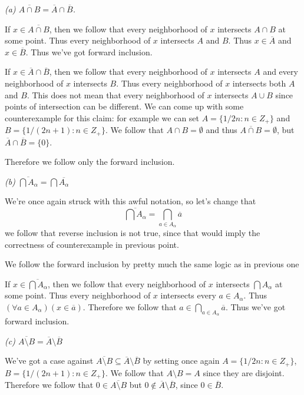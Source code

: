 \documentclass[11pt,oneside,titlepage]{book}
\newcommand{\set}[1]{\{ #1 \}}
\begin{document}
\textit{(a) $\overline{A \cap B} = \overline{A} \cap \overline{B}$.}

If $x \in \overline{A \cap B}$, then we follow that every neighborhood of $x$
intersects $A \cap B$ at some point. Thus every neighborhood of $x$ intersects
$A$ and $B$. Thus $x \in \overline{A}$ and $x \in \overline{B}$. Thus we've got
forward inclusion.

If $x \in \overline{A} \cap \overline{B}$, then we follow that every neighborhood of $x$
intersects $A$ and every neighborhood of $x$ intersects $B$. Thus every
neighborhood of $x$ intersects both $A$ and $B$. This does not mean that
every neighborhood of $x$ intersects $A \cup B$ since points of intersection can be different.
We can come up with some counterexample for this claim:
for example we can set $A = \set{1/2n: n \in Z_+}$ and
$B = \set{1/(2n + 1): n \in Z_+}$. We follow that $A \cap B = \emptyset$ and thus
$\overline{A \cap B} = \emptyset$, but $\overline{A} \cap \overline{B} = \set{0}$.

Therefore we follow only the forward inclusion.

\textit{(b) $\overline{\bigcap{A_\alpha}} = \bigcap{\overline{A_\alpha}}$}

We're once again struck with this awful notation, so let's change that
$$\overline{\bigcap{A_\alpha}} = \bigcap_{a \in A_\alpha}{\overline{a}}$$
we follow that reverse inclusion is not true, since that would imply
the correctness of counterexample in previous point.

We follow the forward inclusion by pretty much the same logic as in previous one

If $x \in \overline{\bigcap{A_\alpha}}$, then we follow that every neighborhood of $x$
intersects $\bigcap{A_\alpha}$ at some point. Thus every neighborhood of $x$ intersects
every $a \in A_\alpha$. Thus $(\forall a \in A_\alpha)(x \in \overline{a})$.
Therefore we follow that $a \in \bigcap_{a \in A_\alpha}{\overline{a}}$.
Thus we've got forward inclusion.

\textit{(c) $\overline{A \setminus B} = \overline{A} \setminus \overline{B}$}

We've got a case against
$\overline{A \setminus B} \subseteq  \overline{A} \setminus \overline{B}$
by setting once again $A = \set{1/2n: n \in Z_+}$, $B = \set{1/(2n + 1): n \in Z_+}$.
We follow that $A \setminus B = A$ since they are disjoint. Therefore we follow that
$0 \in \overline{A \setminus B}$ but $0 \notin \overline{A} \setminus \overline{B}$,
since $0 \in \overline{B}$.
\end{document}
